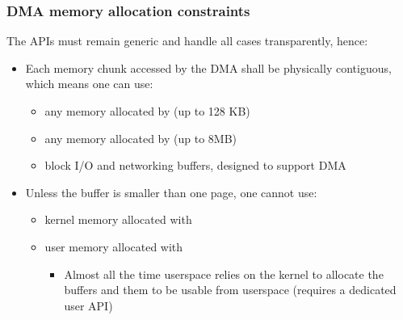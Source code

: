 \begin{frame}
  \frametitle{DMA memory allocation constraints}
  The APIs must remain generic and handle all cases transparently, hence:
  \begin{itemize}
  \item Each memory chunk accessed by the DMA shall be physically
    contiguous, which means one can use:
    \begin{itemize}
    \item any memory allocated by  (up to 128 KB)
    \item any memory allocated by  (up to 8MB)
    \item block I/O and networking buffers, designed to support DMA
    \end{itemize}
  \item Unless the buffer is smaller than one page, one cannot use:
    \begin{itemize}
    \item kernel memory allocated with 
    \item user memory allocated with 
      \begin{itemize}
      \item Almost all the time userspace relies on the kernel to allocate
        the buffers and  them to be usable from userspace
        (requires a dedicated user API)
      \end{itemize}
    \end{itemize}
  \end{itemize}
\end{frame}

